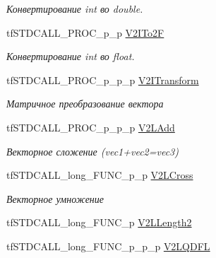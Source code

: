 \begin{DoxyCompactItemize}
\begin{DoxyCompactList}\small\item\em Конвертирование int во double. \end{DoxyCompactList}\item 
\hypertarget{structs_functions_vector_c_p_u_a4cc92edd061bd6a5fd9a7f3852d949e2}{tf\-S\-T\-D\-C\-A\-L\-L\-\_\-\-P\-R\-O\-C\-\_\-p\-\_\-p \hyperlink{structs_functions_vector_c_p_u_a4cc92edd061bd6a5fd9a7f3852d949e2}{V2\-I\-To2\-F}}\label{structs_functions_vector_c_p_u_a4cc92edd061bd6a5fd9a7f3852d949e2}

\begin{DoxyCompactList}\small\item\em Конвертирование int во float. \end{DoxyCompactList}\item 
\hypertarget{structs_functions_vector_c_p_u_a9507490e34803882934f296dfeebbd33}{tf\-S\-T\-D\-C\-A\-L\-L\-\_\-\-P\-R\-O\-C\-\_\-p\-\_\-p\-\_\-p \hyperlink{structs_functions_vector_c_p_u_a9507490e34803882934f296dfeebbd33}{V2\-I\-Transform}}\label{structs_functions_vector_c_p_u_a9507490e34803882934f296dfeebbd33}

\begin{DoxyCompactList}\small\item\em Матричное преобразование вектора \end{DoxyCompactList}\item 
\hypertarget{structs_functions_vector_c_p_u_aa7d0ab669982a80f09ee8c9b92343e12}{tf\-S\-T\-D\-C\-A\-L\-L\-\_\-\-P\-R\-O\-C\-\_\-p\-\_\-p\-\_\-p \hyperlink{structs_functions_vector_c_p_u_aa7d0ab669982a80f09ee8c9b92343e12}{V2\-L\-Add}}\label{structs_functions_vector_c_p_u_aa7d0ab669982a80f09ee8c9b92343e12}

\begin{DoxyCompactList}\small\item\em Векторное сложение (vec1+vec2=vec3) \end{DoxyCompactList}\item 
\hypertarget{structs_functions_vector_c_p_u_af2cda7550c383d71d313a3de6094eea9}{tf\-S\-T\-D\-C\-A\-L\-L\-\_\-long\-\_\-\-F\-U\-N\-C\-\_\-p\-\_\-p \hyperlink{structs_functions_vector_c_p_u_af2cda7550c383d71d313a3de6094eea9}{V2\-L\-Cross}}\label{structs_functions_vector_c_p_u_af2cda7550c383d71d313a3de6094eea9}

\begin{DoxyCompactList}\small\item\em Векторное умножение \end{DoxyCompactList}\item 
tf\-S\-T\-D\-C\-A\-L\-L\-\_\-long\-\_\-\-F\-U\-N\-C\-\_\-p \hyperlink{structs_functions_vector_c_p_u_a37657df5bfef9298c79e94592b2c7423}{V2\-L\-Length2}
\item 
\hypertarget{structs_functions_vector_c_p_u_ada4595c47d093deba428249e50ac7cb3}{tf\-S\-T\-D\-C\-A\-L\-L\-\_\-long\-\_\-\-F\-U\-N\-C\-\_\-p\-\_\-p\-\_\-p \hyperlink{structs_functions_vector_c_p_u_ada4595c47d093deba428249e50ac7cb3}{V2\-L\-Q\-D\-F\-L}}\label{structs_functions_vector_c_p_u_ada4595c47d093deba428249e50ac7cb3}


\end{DoxyCompactItemize}

